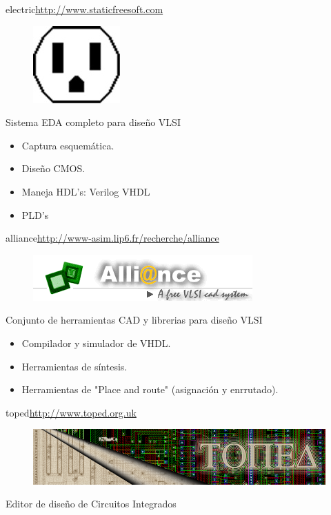 \documentclass{beamer}
\begin{document}
\begin{frame}{electric}{\url{http://www.staticfreesoft.com}}
  \begin{figure}[!h]
    \centering
    \includegraphics[scale=0.5]{img/electric.jpg}
  \end{figure}
  Sistema EDA completo para diseño VLSI
  \begin{itemize}
  \item Captura esquemática.
  \item Diseño CMOS.
  \item Maneja HDL's: Verilog VHDL
  \item PLD's
  \end{itemize}
\end{frame}

\begin{frame}{alliance}{\url{http://www-asim.lip6.fr/recherche/alliance}}
  \begin{figure}[!h]
    \centering
    \includegraphics[scale=0.5]{img/alliancelogo.png}
  \end{figure}
  Conjunto de herramientas CAD y librerias para diseño VLSI
  \begin{itemize}
  \item Compilador y simulador de VHDL.
  \item Herramientas de síntesis.
  \item Herramientas de "Place and route" (asignación y enrrutado).
  \end{itemize}
\end{frame}

\begin{frame}{toped}{\url{http://www.toped.org.uk}}
  \begin{figure}[!h]
    \centering
    \includegraphics[scale=0.3]{img/toped.png}
  \end{figure}
  Editor de diseño de Circuitos Integrados
\end{frame}
\end{document}
